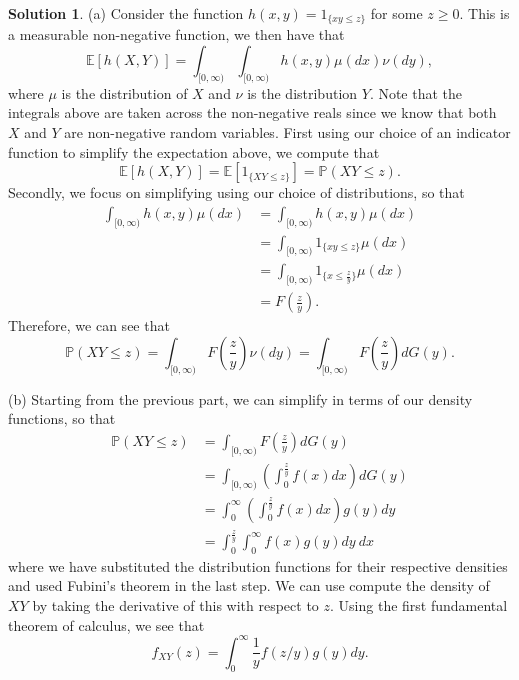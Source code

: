 \documentclass[12pt]{article}
\newcommand{\Prob}{\mathbb{P}}
\newcommand{\Expect}{\mathbb{E}}
\theoremstyle{definition}
\newtheorem{sol}{Solution}
\theoremstyle{remark}
\begin{document}
\begin{sol} \leavevmode
    
    (a) Consider the function $h(x,y) = 1_{ \{xy \leq z \} }$ for some $z\geq 0$. This is a measurable non-negative function, we then have that
    \begin{equation}
        \Expect[ h(X,Y) ] = \int_{[0,\infty)} \int_{[0, \infty)} h(x,y) \mu(dx) \nu(dy),
    \end{equation}
    where $\mu$ is the distribution of $X$ and $\nu$ is the distribution $Y$. Note that the integrals above are taken across the non-negative reals since we know that both $X$ and $Y$ are non-negative random variables. First using our choice of an indicator function to simplify the expectation above, we compute that
    \begin{equation}
        \Expect[ h(X,Y) ] = \Expect[ 1_{ \{XY \leq z \} } ] = \Prob( XY \leq z). 
    \end{equation}
    Secondly, we focus on simplifying using our choice of distributions, so that
    \begin{align}
        \int_{[0, \infty)} h(x,y) \mu(dx) &=  \int_{[0, \infty)} h(x,y) \mu(dx) \\ 
                                          &=  \int_{[0, \infty)}  1_{ \{xy \leq z \} } \mu(dx)\\ 
                                          &=  \int_{[0, \infty)}  1_{ \{x \leq \frac{z}{y} \} } \mu(dx)\\ 
                                          &= F \left(\frac{z}{y} \right).
    \end{align}
    Therefore, we can see that 
    \begin{equation}
        \Prob( XY \leq z) = \int_{[0,\infty)} F \left(\frac{z}{y} \right) \nu(dy) =\int_{[0,\infty)} F \left(\frac{z}{y} \right) dG(y).  
    \end{equation}

    (b) Starting from the previous part, we can simplify in terms of our density functions, so that
    \begin{align}
        \Prob(XY\leq z) &= \int_{[0,\infty)} F \left(\frac{z}{y} \right) dG(y) \\  
                    &= \int_{[0,\infty)} \left( \int_{0}^{\frac{z}{y}}  f(x)dx \right) dG(y) \\   
                    &= \int_0^\infty \left( \int_{0}^{\frac{z}{y}}  f(x)dx \right) g(y)dy\\
                    &=  \int_{0}^{\frac{z}{y}} \int_0^\infty f(x) g(y)dy\ dx
    \end{align}
    where we have substituted the distribution functions for their respective densities and used Fubini's theorem in the last step. We can use compute the density of $XY$ by taking the derivative of this with respect to $z$. Using the first fundamental theorem of calculus, we see that
    \begin{equation}
        f_{XY}(z) =  \int_0^\infty \frac{1}{y}f(z/y) g(y) dy.
    \end{equation}


\end{sol}
\end{document}
